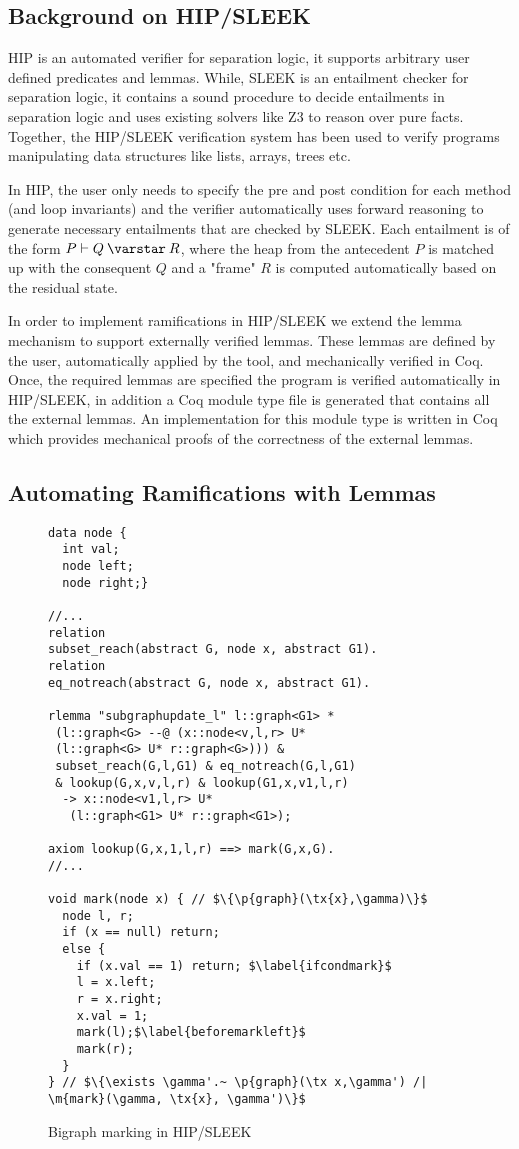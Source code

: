 \subsection{Background on HIP/SLEEK}
HIP is an automated verifier for separation logic, it supports arbitrary user defined predicates and lemmas. While, SLEEK
is an entailment checker for separation logic, it contains a sound  procedure to decide entailments in separation logic and uses existing solvers like Z3 to reason over pure facts. Together, the HIP/SLEEK verification system \cite{chin:hipsleek} has been used to verify programs manipulating data structures like lists, arrays, trees etc.

In HIP, the user only needs to specify the pre and post condition for each method (and loop invariants) and the verifier automatically uses forward reasoning to generate necessary entailments that are checked by SLEEK. Each entailment is of the form $P \vdash Q \scon R$, where the heap from the antecedent $P$ is matched up with the consequent $Q$ and a "frame" $R$ is computed automatically based on the residual state.

In order to implement ramifications in HIP/SLEEK we extend the lemma mechanism \cite{NguyenC08} to support externally verified lemmas. These lemmas are defined by the user, automatically applied by the tool, and mechanically verified in Coq. Once, the required lemmas are specified the program is verified automatically in HIP/SLEEK, in addition a Coq module type file is generated that contains all the external lemmas. An implementation for this module type is written in Coq which provides mechanical proofs of the correctness of the external lemmas.

\subsection{Automating Ramifications with Lemmas}

\begin{figure}[t]
  \begin{lstlisting}
data node {
  int val;
  node left;
  node right;}

//...
relation 
subset_reach(abstract G, node x, abstract G1).
relation 
eq_notreach(abstract G, node x, abstract G1).  
  
rlemma "subgraphupdate_l" l::graph<G1> *
 (l::graph<G> --@ (x::node<v,l,r> U*
 (l::graph<G> U* r::graph<G>))) & 
 subset_reach(G,l,G1) & eq_notreach(G,l,G1)
 & lookup(G,x,v,l,r) & lookup(G1,x,v1,l,r)
  -> x::node<v1,l,r> U* 
   (l::graph<G1> U* r::graph<G1>);
   
axiom lookup(G,x,1,l,r) ==> mark(G,x,G).
//...
      
void mark(node x) { // $\{\p{graph}(\tx{x},\gamma)\}$
  node l, r;
  if (x == null) return;
  else {
    if (x.val == 1) return; $\label{ifcondmark}$
    l = x.left;
    r = x.right;
    x.val = 1;
    mark(l);$\label{beforemarkleft}$
    mark(r);
  }
} // $\{\exists \gamma'.~ \p{graph}(\tx x,\gamma') /| \m{mark}(\gamma, \tx{x}, \gamma')\}$
\end{lstlisting}
\caption{Bigraph marking in HIP/SLEEK}
\label{fig:hipmarkgraph}
\end{figure}

